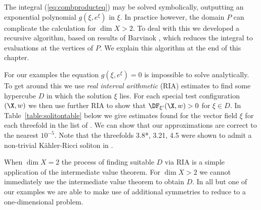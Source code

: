 The integral (\ref{eq:combproducteq}) may be solved symbolically, outputting an exponential polynomial \(g(\xi, e^{\xi})\) in \(\xi\). In practice however, the domain \(P\) can complicate the calculation for \(\dim X > 2\). To deal with this we developed a recursive algorithm, based on results of Barvinok \cite{Barvinok1992}, which reduces the integral to evaluations at the vertices of \(P\). We explain this algorithm at the end of this chapter.

For our examples the equation \(g(\xi,e^{\xi}) = 0\) is impossible to solve analytically. To get around this we use \textit{real interval arithmetic} (RIA) estimates to find some hypercube \(D\) in which the solution \(\xi\) lies. For each special test configuration \((\X,w)\) we then use further RIA to show that \(\DF_{\xi'}(\X,w)>0\) for \(\xi \in D\). In Table~\ref{table:solitontable} below we give estimates found for the vector field \(\xi\) for each threefold in the list of \cite{suss2013fano}.  We can show that our approximations are correct to the nearest \(10^{-5}\). Note that the threefolds 3.8*, 3.21, 4.5 were shown to admit a non-trivial K\"ahler-Ricci soliton in \cite{ilten2015}.

When \(\dim  X = 2\) the process of finding suitable \(D\) via RIA is a simple application of the intermediate value theorem. For \(\dim X >2 \) we cannot immediately use the intermediate value theorem to obtain \(D\). In all but one of our examples we are able to make use of additional symmetries to reduce to a one-dimensional problem.

